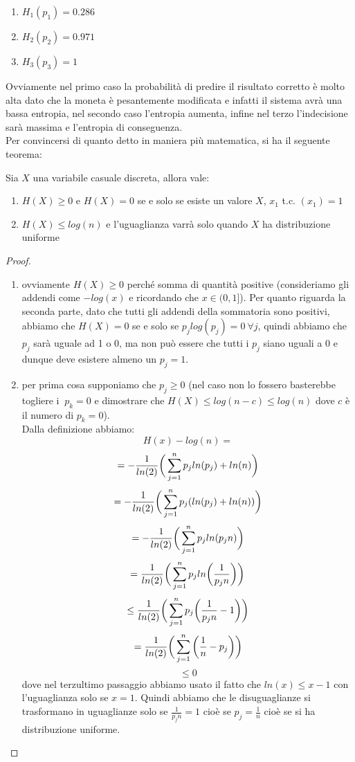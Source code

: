 \begin{enumerate}
\item$H_1(p_1)=0.286$
\item$H_2(p_2)=0.971$
\item$H_3(p_3)=1$
\end{enumerate}
Ovviamente nel primo caso la probabilità di predire il risultato corretto è molto alta dato che la moneta è pesantemente modificata e infatti il sistema avrà una bassa entropia, nel secondo caso l'entropia aumenta, infine nel terzo l'indecisione sarà massima e l'entropia di conseguenza.\\
Per convincersi di quanto detto in maniera più matematica, si ha il seguente teorema:
\begin{teo} \label{teo:6.2}
Sia $X$ una variabile casuale discreta, allora vale:
\begin{enumerate}
\item $H(X)\geq 0$ e $H(X)= 0$ se e solo se esiste un valore $X$, $x_1$ t.c. \p$(x_1)=1$
\item $H(X)\leq log(n)$ e l'uguaglianza varrà solo quando $X$ ha distribuzione uniforme
\end{enumerate}
\end{teo}
\begin{proof} \leavevmode 
\begin{enumerate}
\item ovviamente $H(X)\geq 0$ perché somma di quantità positive (consideriamo gli addendi come $-log(x)$ e ricordando che $x\in (0,1]$). Per quanto riguarda la seconda parte, dato che tutti gli addendi della sommatoria sono positivi, abbiamo che $H(X)=0$ se e solo se $p_jlog(p_j)=0 \  \forall j$, quindi abbiamo che $p_j$ sarà uguale ad 1 o 0, ma non può essere che tutti i $p_j$ siano  uguali a 0 e dunque deve esistere almeno un $p_j=1$.
\item  per prima cosa supponiamo che $p_j\ge 0$ (nel caso non lo fossero basterebbe togliere i $\  p_k=0$ e dimostrare che $H(X)\leq log(n-c)\leq log(n)$ dove $c$ è il numero di $p_k=0$).\\
Dalla definizione abbiamo:
$$H(x)-log(n)=$$
$$=-\frac{1}{ln(2)} \bigg( \sum_{j=1}^n p_j ln (p_j) + ln(n) \bigg)$$
$$=-\frac{1}{ln(2)} \bigg( \sum_{j=1}^n p_j (ln (p_j) + ln(n)) \bigg)$$
$$=-\frac{1}{ln(2)} \bigg( \sum_{j=1}^n p_j ln(p_jn)\bigg)$$
$$=\frac{1}{ln(2)} \bigg( \sum_{j=1}^n p_j ln \bigg( \frac{1}{p_jn} \bigg) \bigg)$$
$$\leq \frac{1}{ln(2)} \bigg( \sum_{j=1}^n p_j \bigg( \frac{1}{p_jn} -1 \bigg) \bigg)$$
$$= \frac{1}{ln(2)} \bigg( \sum_{j=1}^n \bigg( \frac{1}{n} -p_j \bigg) \bigg)$$
$$\leq 0$$
dove nel terzultimo passaggio abbiamo usato il fatto che $ln(x)\leq x-1$ con l'uguaglianza solo se $x=1$. Quindi abbiamo che le disuguaglianze si trasformano in uguaglianze solo se $\frac{1}{p_jn}=1$ cioè se $p_j=\frac{1}{n}$ cioè se si ha distribuzione uniforme.
\end{enumerate}
\end{proof}



